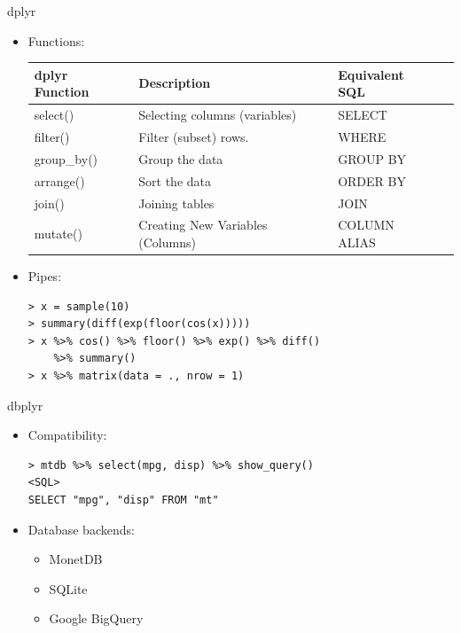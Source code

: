\documentclass{beamer}
\begin{document}
\begin{frame}[fragile]{dplyr}
  \begin{itemize}
  \item { Functions:
    \begin{center}
    \small
    \begin{tabular}{ |l|l|l|l| } 
    \hline
    \textbf{dplyr Function} & \textbf{Description} & \textbf{Equivalent SQL} \\
    \hline
    select() & Selecting columns (variables) & SELECT \\ 
    filter() & Filter (subset) rows. & WHERE \\ 
    group\_by() & Group the data & GROUP BY \\ 
    arrange() & Sort the data & ORDER BY \\ 
    join() & Joining tables & JOIN \\ 
    mutate() & Creating New Variables (Columns) & COLUMN ALIAS \\ 
    \hline
    \end{tabular}
    \end{center}
  }
  
  \pause
  
  \item { Pipes:\\
    \begin{lstlisting}
> x = sample(10)
> summary(diff(exp(floor(cos(x)))))
> x %>% cos() %>% floor() %>% exp() %>% diff() 
    %>% summary()
> x %>% matrix(data = ., nrow = 1)
    \end{lstlisting}


  }
  \end{itemize}
\end{frame}


\begin{frame}[fragile]{dbplyr}
  \begin{itemize}
    \item { Compatibility:\\
     \begin{lstlisting}
> mtdb %>% select(mpg, disp) %>% show_query()
<SQL>
SELECT "mpg", "disp" FROM "mt"
    \end{lstlisting}
  }
  
  \pause
  
  \item { Database backends:\\
        \begin{itemize}
         \item {
            MonetDB \citep{monetdb}
        }
        \item {
        SQLite \citep{sqlite}
        }
        \item {
        Google BigQuery \citep{bigquery}
        }
        \end{itemize}
  }

  \end{itemize}
\end{frame}
\end{document}

